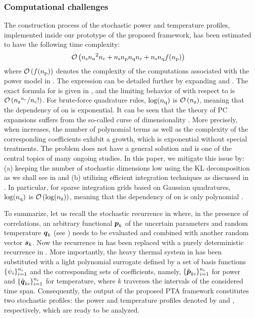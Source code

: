 \subsubsection{Computational challenges}

The construction process of the stochastic power and temperature profiles,
implemented inside our prototype of the proposed framework, has been estimated
to have the following time complexity:
\[
  \mathcal{O}\left({n_\mathrm{s}} {n_\mathrm{n}}^2 {n_\mathrm{c}} + {n_\mathrm{s}} {n_\mathrm{p}} {n_\mathrm{q}} {n_\mathrm{c}} + {n_\mathrm{s}} {n_\mathrm{q}} f({n_\mathrm{p}})\right)
\]
where $\mathcal{O}\left(f({n_\mathrm{p}})\right)$ denotes the complexity of the computations associated with
the power model in . The expression can be detailed further by
expanding \nc and \nq. The exact formula for \nc is given in ,
and the limiting behavior of \nc with respect to \nz is $\mathcal{O}\left({n_\mathrm{z}}^{n_\mathrm{c}} / {n_\mathrm{c}}!\right)$.
For brute-force quadrature rules, $\log({n_\mathrm{q}})$ is $\mathcal{O}\left({n_\mathrm{z}}\right)$, meaning that the
dependency of \nq on \nz is exponential. It can be seen that the theory of PC
expansions suffers from the so-called curse of dimensionality \cite{xiu2010,
eldred2008}. More precisely, when \nz increases, the number of polynomial terms
as well as the complexity of the corresponding coefficients exhibit a growth,
which is exponential without special treatments. The problem does not have a
general solution and is one of the central topics of many ongoing studies. In
this paper, we mitigate this issue by: (a) keeping the number of stochastic
dimensions low using the KL decomposition as we shall see in
 and (b) utilizing efficient integration
techniques as discussed in . In particular, for sparse
integration grids based on Gaussian quadratures, $\log({n_\mathrm{q}})$ is
$\mathcal{O}\left(\log({n_\mathrm{z}})\right)$, meaning that the dependency of \nq on \nz is only polynomial
\cite{heiss2008}.

To summarize, let us recall the stochastic recurrence in 
where, in the presence of correlations, an arbitrary functional $\boldsymbol{p}_k$ of the
uncertain parameters \vu and random temperature $\boldsymbol{q}_k$ (see )
needs to be evaluated and combined with another random vector $\boldsymbol{s}_k$. Now the
recurrence in  has been replaced with a purely deterministic
recurrence in . More importantly, the heavy thermal system
in  has been substituted with a light polynomial surrogate
defined by a set of basis functions $\{ \psi_i \}_{i = 1}^{n_\mathrm{c}}$ and the
corresponding sets of coefficients, namely, $\{ \hat{\boldsymbol{p}}_{ki} \}_{i = 1}^{n_\mathrm{c}}$
for power and $\{ \hat{\boldsymbol{q}}_{ki} \}_{i = 1}^{n_\mathrm{c}}$ for temperature, where $k$
traverses the \ns intervals of the considered time span. Consequently, the
output of the proposed PTA framework constitutes two stochastic profiles: the
power and temperature profiles denoted by \mp and \mq, respectively, which are
ready to be analyzed.

